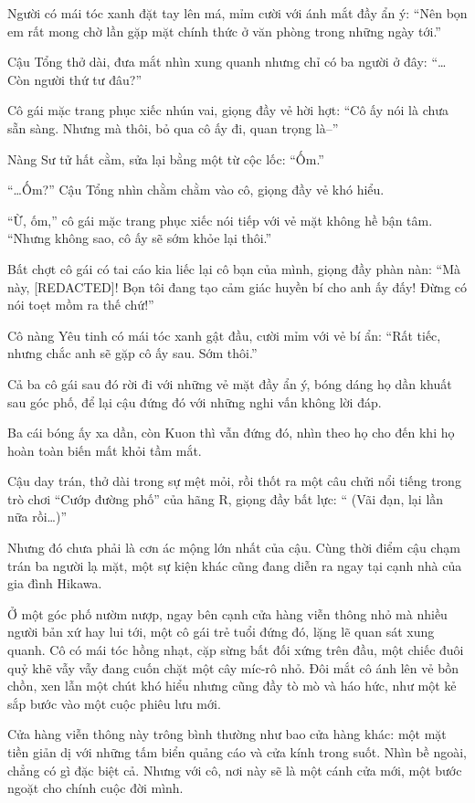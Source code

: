 \documentclass[../main.tex]{subfiles}
\begin{document}
Người có mái tóc xanh đặt tay lên má, mỉm cười với ánh mắt đầy ẩn ý: ``Nên bọn em rất mong chờ lần gặp mặt chính thức ở văn phòng trong những ngày tới.''

Cậu Tổng thở dài, đưa mắt nhìn xung quanh nhưng chỉ có ba người ở đây: ``\dots Còn người thứ tư đâu?''

Cô gái mặc trang phục xiếc nhún vai, giọng đầy vẻ hời hợt: ``Cô ấy nói là chưa sẵn sàng. Nhưng mà thôi, bỏ qua cô ấy đi, quan trọng là--''

Nàng Sư tử hất cằm, sửa lại bằng một từ cộc lốc: ``Ốm.''

``\dots Ốm?'' Cậu Tổng nhìn chằm chằm vào cô, giọng đầy vẻ khó hiểu.

``Ừ, ốm,'' cô gái mặc trang phục xiếc nói tiếp với vẻ mặt không hề bận tâm. ``Nhưng không sao, cô ấy sẽ sớm khỏe lại thôi.''

Bất chợt cô gái có tai cáo kia liếc lại cô bạn của mình, giọng đầy phàn nàn: ``Mà này, [REDACTED]! Bọn tôi đang tạo cảm giác huyền bí cho anh ấy đấy! Đừng có nói toẹt mồm ra thế chứ!''

Cô nàng Yêu tinh có mái tóc xanh gật đầu, cười mỉm với vẻ bí ẩn: ``Rất tiếc, nhưng chắc anh sẽ gặp cô ấy sau. Sớm thôi.''

Cả ba cô gái sau đó rời đi với những vẻ mặt đầy ẩn ý, bóng dáng họ dần khuất sau góc phố, để lại cậu đứng đó với những nghi vấn không lời đáp.

Ba cái bóng ấy xa dần, còn Kuon thì vẫn đứng đó, nhìn theo họ cho đến khi họ hoàn toàn biến mất khỏi tầm mắt.

Cậu day trán, thở dài trong sự mệt mỏi, rồi thốt ra một câu chửi nổi tiếng trong trò chơi ``Cướp đường phố'' của hãng R, giọng đầy bất lực: ``\href{https://www.youtube.com/watch?v=-1qju6V1jLM}{} (Vãi đạn, lại lần nữa rồi\dots)''

Nhưng đó chưa phải là cơn ác mộng lớn nhất của cậu. Cùng thời điểm cậu chạm trán ba người lạ mặt, một sự kiện khác cũng đang diễn ra ngay tại cạnh nhà của gia đình Hikawa.

Ở một góc phố nườm nượp, ngay bên cạnh cửa hàng viễn thông nhỏ mà nhiều người bản xứ hay lui tới, một cô gái trẻ tuổi đứng đó, lặng lẽ quan sát xung quanh. Cô có mái tóc hồng nhạt, cặp sừng bất đối xứng trên đầu, một chiếc đuôi quỷ khẽ vẫy vẫy đang cuốn chặt một cây míc-rô nhỏ. Đôi mắt cô ánh lên vẻ bồn chồn, xen lẫn một chút khó hiểu nhưng cũng đầy tò mò và háo hức, như một kẻ sắp bước vào một cuộc phiêu lưu mới.

Cửa hàng viễn thông này trông bình thường như bao cửa hàng khác: một mặt tiền giản dị với những tấm biển quảng cáo và cửa kính trong suốt. Nhìn bề ngoài, chẳng có gì đặc biệt cả. Nhưng với cô, nơi này sẽ là một cánh cửa mới, một bước ngoặt cho chính cuộc đời mình.
\end{document}
